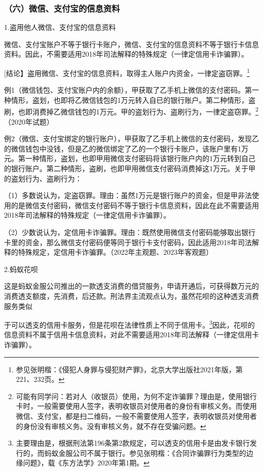 \subsubsection*{（六）微信、支付宝的信息资料}

1.盗用他人微信、支付宝的信息资料

微信、支付宝账户不等于银行卡账户，微信、支付宝的信息资料不等于银行卡信息资料。因此，不需要适用2018年司法解释的特殊规定（一律定信用卡诈骗罪）。

[结论】盗用微信、支付宝的信息资料，取得主人账户内资金，一律定盗窃罪。\footnote{参见张明楷：《侵犯人身罪与侵犯财产罪》，北京大学出版社2021年版，第221、232页。}

例1（微信钱包、支付宝账户内的余额），甲获取了乙手机上微信的支付密码。第一种情形，盗划，也即将乙微信钱包的1万元转入自已的银行账户。第二种情形，盗刷，也即消费掉乙微信钱包的1万元。甲的盗划行为、盗刷行为，一律定盗窃罪。\footnote{可能有同学问：若对人（收银员）使用，为何不定诈骗罪？理由是，使用银行卡时，一般需要使用人签字，表明收银员对使用者的身份有审核义务。而使用微信、支付宝，都是扫二维码，一般不需要使用人签字，表明收银员对使用者的身份没有审核义务。没有审核义务，就不存在受骗问题。}（2020年试题）

例2（微信、支付宝绑定的银行账户），甲获取了乙手机上微信的支付密码，发现乙的微信钱包中没钱，但是乙的微信绑定了乙的一个银行卡账户，该账户里有1万元。第一种情形，盗划，也即甲用微信支付密码将该银行账户内的1万元转到自己的银行账户。第二种情形，盗刷，也即甲用微信支付密码消费掉这1万元。关于甲的盗划行为、盗刷行为：

（1）多数说认为，定盗窃罪。理由：虽然1万元是银行账户的资金，但是甲非法使用的是微信支付密码，微信支付密码不等于银行卡信息资料，因此在此不需要适用2018年司法解释的特殊规定（一律定信用卡诈骗罪）。

（2）少数说认为，定信用卡诈骗罪。理由：既然使用微信支付密码能够取出银行卡里的资金，那么微信支付密码便等同于银行卡支付密码，因此适用2018年司法解释的特殊规定，定信用卡诈骗罪。（2022年主观题、2023年客观题）

2.蚂蚁花呗

这是蚂蚁金服公司推出的一款透支消费的借贷服务，申请开通后，可获得数万元的消费透支额度，先消费，后还款。刑法界主流观点认为，虽然花呗的这种透支消费服务类似

于可以透支的信用卡服务，但是花呗在法律性质上不同于信用卡。\footnote{主要理由是，根据刑法第196条第2款规定，可以透支的信用卡是由发卡银行发行的，而蚂蚁金服公司不属于银行。参见张明楷：《合同诈骗罪行为类型的边缘问题》，载《东方法学》2020年第1期。}因此，花呗的信息资料不属于信用卡信息资料，对此不需要适用2018年司法解释（一律定信用卡诈骗罪）。

